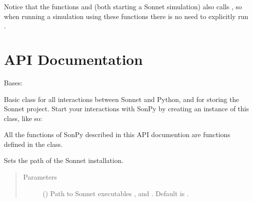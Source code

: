 \documentclass[letterpaper,10pt,english,openany]{sphinxmanual}
\begin{document}
Notice that the functions  and  (both starting a Sonnet simulation) also calls , so when running a simulation using these functions there is no need to explicitly run .


\chapter{API Documentation}
\label{\detokenize{source/sonpy:module-sonpy}}\label{\detokenize{source/sonpy:api-documentation}}\label{\detokenize{source/sonpy::doc}}

\begin{fulllineitems}
\label{\detokenize{source/sonpy:sonpy.sonnet}}
Bases: 

Basic class for all interactions between Sonnet and Python, and for storing the Sonnet project. Start your interactions with SonPy by creating an instance of this class, like so:

%
\begin{sphinxVerbatim}[commandchars=\\\{\}]
 
  
\end{sphinxVerbatim}

All the functions of SonPy described in this API documention are functions defined in the {\hyperref[\detokenize{source/sonpy:sonpy.sonnet}]{}} class.

\begin{fulllineitems}
\label{\detokenize{source/sonpy:sonpy.sonnet.setSonnetInstallationPath}}
Sets the path of the Sonnet installation.
\begin{quote}\begin{description}
\item[{Parameters}] \leavevmode
{} () \textendash{} Path to Sonnet executables ,  and . Default is .


\end{description}
\end{quote}
\end{fulllineitems}
\end{fulllineitems}
\end{document}
